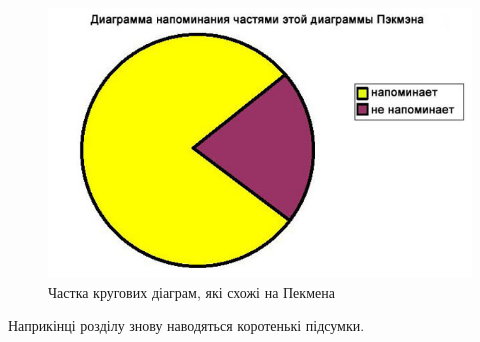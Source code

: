 \begin{figure}[ht]
        \centering
        \includegraphics[scale=0.5]{Images/Pacman.jpg}
        \caption{Частка кругових діаграм, які схожі на Пекмена}
        \label{fig_pacman}
\end{figure}

\chapconclude{\ref{chap:theory}}

Наприкінці розділу знову наводяться коротенькі підсумки.